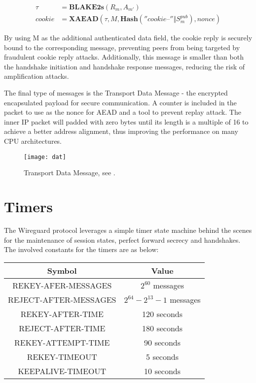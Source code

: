     \begin{align*}
      \tau &= \textbf{BLAKE2s}(R_m, A_{m'}) \\
      cookie &= \textbf{XAEAD}(\tau, M, \textbf{Hash}(''cookie\texttt{--}'' \Vert S^{pub}_m), nonce)
    \end{align*}

    By using M as the additional authenticated data field, the cookie reply is securely bound 
    to the corresponding message, preventing peers from being targeted by fraudulent cookie 
    reply attacks. Additionally, this message is smaller than both the handshake initiation and 
    handshake response messages, reducing the risk of amplification attacks.

    The final type of messages is the Transport Data Message - the encrypted encapsulated payload
    for secure communication. A counter is included in the packet to use as the nonce for AEAD
    and a tool to prevent replay attack. The inner IP packet will padded with zero bytes until
    its length is a multiple of 16 to achieve a better address alignment, thus improving the
    performance on many CPU architectures.

    \begin{figure}[h]
      \centering
      \texttt{[image: dat]}
      \caption{Transport Data Message, see \cite[p.~12]{wireguard}.}
      \label{fig:transdata}
    \end{figure} 


\section{Timers} \label{w4}
The Wireguard protocol leverages a simple timer state machine behind the scenes for the 
maintenance of session states, perfect forward secrecy and handshakes. The involved constants
for the timers are as below:

\begin{center}
  \begin{tabular}{|c | c|} 
   \hline
   Symbol & Value \\
   \hline\hline
   \uppercase{Rekey-Afer-Messages} & $2^{60}$ messages \\ 
   \hline
   \uppercase{Reject-After-Messages} & $2^{64} - 2^{13} - 1$ messages \\
   \hline
   \uppercase{REKEY-AFTER-TIME} & 120 seconds \\
   \hline
   \uppercase{reject-after-time} & 180 seconds \\
   \hline
   \uppercase{rekey-attempt-time} & 90 seconds \\
   \hline
   \uppercase{rekey-timeout} & 5 seconds \\
   \hline
   \uppercase{keepalive-timeout} & 10 seconds \\
   \hline
  \end{tabular}
  \end{center}

